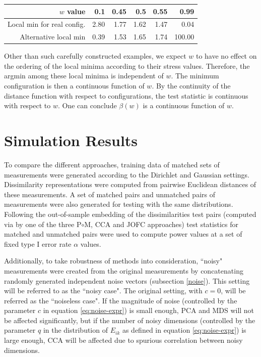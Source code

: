 \documentclass[11pt]{article} %
\begin{document}
\begin{table}[ht]
\begin{center}
\begin{tabular}{rrrrrr}
  \hline
 $w$ value & 0.1 & 0.45 & 0.5 & 0.55 & 0.99 \\ 
  \hline
Local min for real config. & 2.80 & 1.77 & 1.62 & 1.47 & 0.04 \\ 
  Alternative local min & 0.39 & 1.53 & 1.65 & 1.74 & 100.00 \\ 
   \hline
\end{tabular}
\end{center}
\end{table}


Other than such carefully constructed examples, we expect $w$ to have no effect on the ordering of the local minima according to their stress values.
Therefore,  the argmin among these local minima is independent of $w$. The minimum configuration is then a continuous function of $w$. 
By the continuity of the distance function with respect to configurations, the test statistic is continuous with respect to $w$. One can conclude $\beta(w) $ is a continuous function of $w$. 

 



\section{Simulation Results\label{sec:Simulation Results}}
To compare the  different approaches, training data of matched sets of measurements were generated according to the Dirichlet and Gaussian settings. Dissimilarity representations were computed from pairwise Euclidean distances of these measurements. A set of matched pairs and unmatched pairs of measurements were also generated for testing with the same distributions. Following the out-of-sample embedding of the dissimilarities test pairs (computed via by one of the three P$\circ $M, CCA and JOFC approaches)  test statistics  for matched and unmatched pairs were used to compute power values at a set of fixed type I error rate $\alpha$ values.

 Additionally, to take robustness of methods into consideration, ``noisy" measurements were created from the original measurements by concatenating randomly generated independent noise vectors (subsection \ref{noise}).   This setting will be referred to as the ``noisy case". The original setting, with $c=0$,  will be referred as the ``noiseless case".
If the magnitude of noise (controlled by the parameter $c$ in equation \eqref{eq:noise-expr}) is small enough, PCA and MDS will not be affected significantly, but if the number of noisy dimensions (controlled by the parameter $q$ in the distribution of $E_{ik}$ as defined in equation \eqref{eq:noise-expr}) is large enough, CCA  will be affected due to spurious correlation between noisy dimensions.
\end{document}
